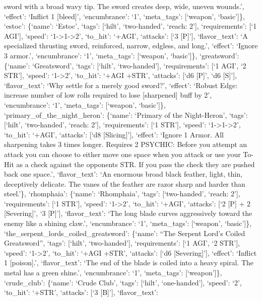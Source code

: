 \documentclass[
  letterpaper,
  DIV=11,
  numbers=noendperiod]{scrartcl}
\begin{document}
sword with a broad wavy tip. The sword creates deep, wide, uneven
wounds.', `effect': `Inflict 1 {[}bleed{]}', `encumbrance': `1',
`meta\_tags': {[}`weapon', `basic'{]}\}, `estoc': \{`name': `Estoc',
`tags': {[}`hilt', `two-handed', `reach: 2'{]}, `requirements': {[}`1
AGI'{]}, `speed': `1-\textgreater1-\textgreater2', `to\_hit': `+AGI',
`attacks': {[}`3 {[}P{]}'{]}, `flavor\_text': `A specialized thrusting
sword, reinforced, narrow, edgless, and long.', `effect': `Ignore 3
armor.', `encumbrance': `1', `meta\_tags': {[}`weapon', `basic'{]}\},
`greatsword': \{`name': `Greatsword', `tags': {[}`hilt',
`two-handed'{]}, `requirements': {[}`1 AGI', `2 STR'{]}, `speed':
`1-\textgreater2', `to\_hit': `+AGI +STR', `attacks': {[}`d6 {[}P{]}',
`d6 {[}S{]}'{]}, `flavor\_text': `Why settle for a merely good sword?',
`effect': `Robust Edge: increase number of low rolls required to lose
{[}sharpened{]} buff by 2', `encumbrance': `1', `meta\_tags':
{[}`weapon', `basic'{]}\}, `primary\_of\_the\_night\_heron': \{`name':
`Primary of the Night-Heron', `tags': {[}`hilt', `two-handed', `reach:
2'{]}, `requirements': {[}`1 STR'{]}, `speed':
`1-\textgreater1-\textgreater2', `to\_hit': `+AGI', `attacks': {[}`d8
{[}Slicing{]}'{]}, `effect': `Ignore 1 Armor. All sharpening takes 3
times longer. Requires 2 PSYCHIC: Before you attempt an attack you can
choose to either move one space when you attack or use your To-Hit as a
check against the opponents STR. If you pass the check they are pushed
back one space.', `flavor\_text': `An enormous broad black feather,
light, thin, deceptively delicate. The vanes of the feather are razor
sharp and harder than steel.'\}, `rhomphaia': \{`name': `Rhomphaia',
`tags': {[}`two-handed', `reach: 2'{]}, `requirements': {[}`1 STR'{]},
`speed': `1-\textgreater2', `to\_hit': `+AGI', `attacks': {[}`2 {[}P{]}
+ 2 {[}Severing{]}', `3 {[}P{]}'{]}, `flavor\_text': `The long blade
curves aggressively toward the enemy like a shining claw.',
`encumbrance': `1', `meta\_tags': {[}`weapon', `basic'{]}\},
`the\_serpent\_lords\_coiled\_greatsword': \{`name': ``The Serpent
Lord's Coiled Greatsword'', `tags': {[}`hilt', `two-handed'{]},
`requirements': {[}`1 AGI', `2 STR'{]}, `speed': `1-\textgreater2',
`to\_hit': `+AGI +STR', `attacks': {[}`d6 {[}Severing{]}'{]}, `effect':
`Inflict 1 {[}poison{]}.', `flavor\_text': `The end of the blade is
coiled into a heavy spiral. The metal has a green shine.',
`encumbrance': `1', `meta\_tags': {[}`weapon'{]}\}, `crude\_club':
\{`name': `Crude Club', `tags': {[}`hilt', `one-handed'{]}, `speed':
`2', `to\_hit': `+STR', `attacks': {[}`3 {[}B{]}'{]}, `flavor\_text':
\end{document}

